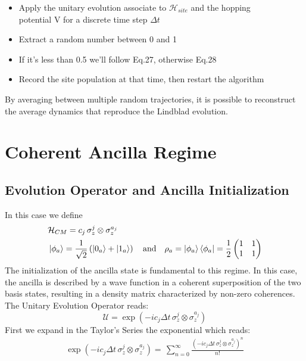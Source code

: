 \documentclass[a4paper,12pt]{article}
\begin{document}
	\begin{itemize}
		\item [1.] Apply the unitary evolution associate to $ \mathcal{H}_{site} $ and the hopping \\ potential V for a discrete time step $ \Delta t $
		\item [2.] Extract a random number between 0 and 1
		\item [3.] If it's less than 0.5 we'll follow Eq.27, otherwise Eq.28
		\item [4.] Record the site population at that time, then restart the algorithm
	\end{itemize}

	By averaging between multiple random trajectories, it is possible to reconstruct the average dynamics that reproduce the Lindblad evolution.

	\clearpage
	\newpage

	\section{Coherent Ancilla Regime}
	\label{sec:Coherent_Ancilla_Regime }

	\subsection{Evolution Operator and Ancilla Initialization}
	\label{sub:Evolution_Operator_and_Ancilla_Initialization_Cohe}

	In this case we define
	\begin{align}
		&\mathcal{H}_{CM} = c_{j} \, \sigma_{z}^{j} \otimes \sigma_{z}^{a_j} \\
		&\ket{\phi_{a}} = \frac{1}{\sqrt{2}} \left(\ket{0_a} + \ket{1_a}\right) \quad \text{and} \quad \rho_{a} = \ket{\phi_a}\bra{\phi_a} = \frac{1}{2} \begin{pmatrix} 1 & 1 \\ 1 & 1 \end{pmatrix}
		\label{eq:cohe_initialization}
	\end{align}
	The initialization of the ancilla state is fundamental to this regime. In this case, the ancilla is described by a wave function in a coherent superposition of the two basis states, resulting in a density matrix characterized by non-zero coherences. \\
	The Unitary Evolution Operator reads:
	\begin{equation}
		\mathcal{U} = \exp{\left( -i c_j \Delta t \, \sigma_{z}^{j} \otimes \sigma_{z}^{a_j} \right)}
		\label{eq:U_def_cohe}
	\end{equation}
	First we expand in the Taylor's Series the exponential which reads:
	\begin{gather}
		\exp{\left( -i c_j \Delta t \, \sigma_{z}^{j} \otimes \sigma_{z}^{a_j} \right)} = \, \sum_{n=0}^{\infty}{\frac{\left( -i c_j \Delta t \, \sigma_{z}^{j} \otimes \sigma_{z}^{a_j} \right)^n}{n!} }
		\label{eq:exp_series_cohe}
	\end{gather}
\end{document}
